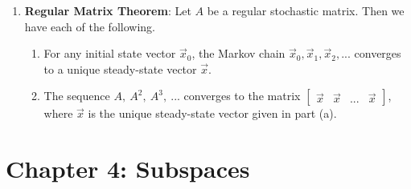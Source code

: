 \documentclass[10pt]{article}
\begin{document}
\begin{enumerate}
\item \textbf{Regular Matrix Theorem}: Let $A$ be a regular stochastic matrix. Then we have each of the following.
\begin{enumerate}
\item For any initial state vector $\vec{x}_0$, the Markov chain $\vec{x}_0,\vec{x}_1,\vec{x}_2,...$ converges to a unique steady-state vector $\vec{x}$.
\item The sequence $A,\ A^2,\ A^3,\ ...$ converges to the matrix $\begin{bmatrix}
\vec{x} & \vec{x} & ... & \vec{x}
\end{bmatrix}$, where $\vec{x}$ is the unique steady-state vector given in part (a).
\end{enumerate}
\end{enumerate}
\section{Chapter 4: Subspaces}
\end{document}

